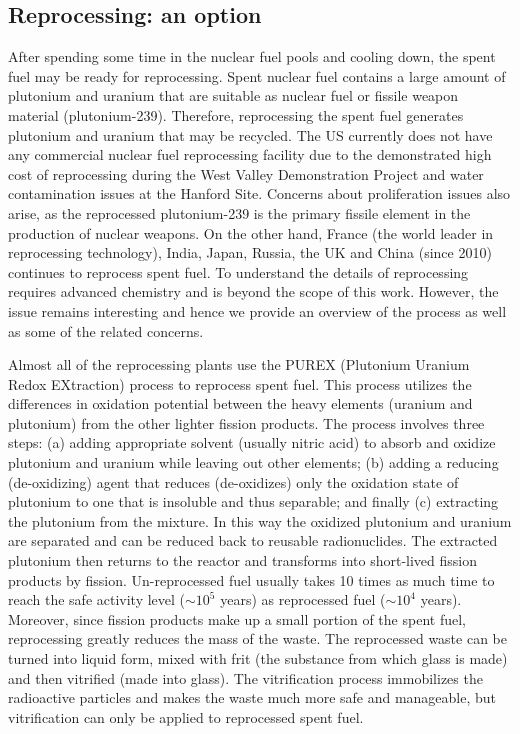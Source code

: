 \documentclass[nofootinbib,preprint,aps]{revtex4-1}
\begin{document}
    \subsection{Reprocessing: an option}
    \label{sec:reproc}
    After spending some time in the nuclear fuel pools and cooling down, the spent fuel may be ready
    for reprocessing.
    Spent nuclear fuel contains a large amount of plutonium and uranium that are suitable as nuclear fuel
    or fissile weapon material (plutonium-239). Therefore, reprocessing the spent fuel generates plutonium and
    uranium that may be recycled. The US currently does not have any commercial nuclear fuel
    reprocessing facility due to the demonstrated high cost of reprocessing
    during the West Valley Demonstration Project and water contamination issues at the Hanford Site.
    Concerns about proliferation issues also arise, as the 
    reprocessed plutonium-239 is the primary fissile element in the production of nuclear weapons.\cite{aa12}
    On the other hand, France (the world leader in reprocessing technology), India, Japan, Russia, the UK
    and China (since 2010) continues to reprocess spent fuel. To understand the details of reprocessing
    requires advanced chemistry and is beyond the scope of this work. However, the issue remains interesting
    and hence we provide an overview of the process as well as some of the related concerns.

    Almost all of the reprocessing plants use the PUREX (Plutonium Uranium Redox EXtraction) process
    to reprocess spent fuel. This process utilizes the differences in oxidation potential 
    between the heavy elements (uranium and plutonium) from the other lighter fission products.
    The process involves three steps: (a) adding appropriate solvent (usually nitric acid) to absorb and oxidize 
    plutonium and uranium while leaving out other elements;
    (b) adding a reducing (de-oxidizing) agent that reduces (de-oxidizes) only the
    oxidation state of plutonium to one that is insoluble
    and thus separable; and finally (c) extracting the plutonium from the mixture. In this way
    the oxidized plutonium and uranium are separated and can be reduced back to reusable radionuclides.\cite{lb01} 
    The extracted plutonium then returns to the reactor and transforms into short-lived fission products
    by fission. Un-reprocessed fuel usually takes 10 times as much time to reach the safe
    activity level ($\sim 10^5$ years) as reprocessed fuel ($\sim 10^4$ years). Moreover, since fission products
    make up a small portion of the spent fuel, reprocessing greatly reduces the mass of the waste. The reprocessed
    waste can be turned into liquid form, mixed with frit (the substance from which glass is made) and then
    vitrified (made into glass). The vitrification process immobilizes the radioactive particles and makes
    the waste much more safe and manageable, but vitrification can only be applied to reprocessed spent fuel.
\end{document}
